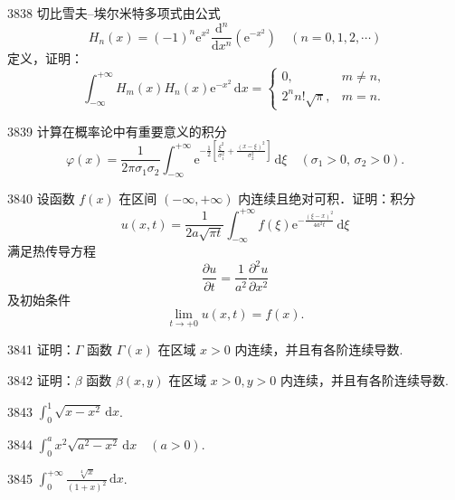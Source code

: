 \begin{prob}[M]{3838}
切比雪夫--埃尔米特多项式由公式
\[
H_n(x) = (-1)^n \mathrm{e}^{x^2} \frac{\mathrm{d}^n}{\mathrm{d}x^n}(\mathrm{e}^{-x^2}) \quad (n=0,1,2,\cdots)
\]
定义，证明：
\[
\int_{-\infty}^{+\infty} H_m(x) H_n(x) \mathrm{e}^{-x^2} \,\mathrm{d}x =
\begin{cases}
0, & m\neq n, \\
2^n n! \sqrt{\pi}, & m=n.
\end{cases}
\]
\end{prob}

\begin{prob}[M]{3839}
计算在概率论中有重要意义的积分
\[
\varphi(x) = \frac{1}{2\pi\sigma_1\sigma_2} \int_{-\infty}^{+\infty} \mathrm{e}^{-\frac{1}{2}\left[\frac{\xi^2}{\sigma_1^2}+\frac{(x-\xi)^2}{\sigma_2^2}\right]} \,\mathrm{d}\xi \quad (\sigma_1>0,\, \sigma_2>0).
\]
\end{prob}

\begin{prob}[L]{3840}
设函数 $f(x)$ 在区间 $(-\infty,+\infty)$ 内连续且绝对可积．证明：积分
\[
u(x,t) = \frac{1}{2a\sqrt{\pi t}} \int_{-\infty}^{+\infty} f(\xi)\mathrm{e}^{-\frac{(\xi-x)^2}{4a^2 t}} \,\mathrm{d}\xi
\]
满足热传导方程
\[
\frac{\partial u}{\partial t} = \frac{1}{a^2}\frac{\partial^2 u}{\partial x^2}
\]
及初始条件
\[
\lim_{t\to+0} u(x,t) = f(x).
\]
\end{prob}


\begin{prob}[M]{3841}
证明：$\Gamma$ 函数 $\Gamma(x)$ 在区域 $x>0$ 内连续，并且有各阶连续导数.
\end{prob}

\begin{prob}[M]{3842}
证明：$\beta$ 函数 $\beta(x,y)$ 在区域 $x>0, y>0$ 内连续，并且有各阶连续导数.
\end{prob}


\begin{prob}[S]{3843}
$\displaystyle \int_0^1 \sqrt{x-x^2} \,\mathrm{d}x$.
\end{prob}

\begin{prob}[S]{3844}
$\displaystyle \int_0^a x^2\sqrt{a^2-x^2} \,\mathrm{d}x \quad (a>0)$.
\end{prob}

\begin{prob}[S]{3845}
$\displaystyle \int_0^{+\infty} \frac{\sqrt[4]{x}}{(1+x)^2} \,\mathrm{d}x$.
\end{prob}

